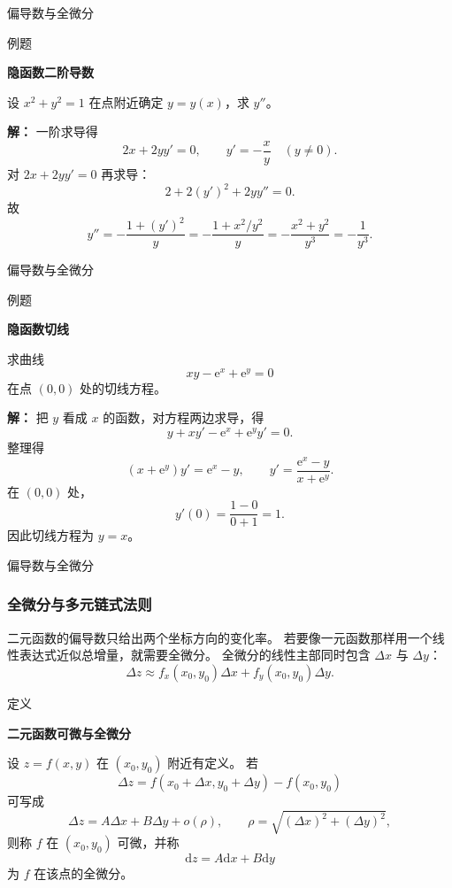\documentclass[aspectratio=169,10pt,fontset=fandol]{ctexbeamer}
\newcommand{\dd}{\mathrm{d}}
\newcommand{\ee}{\mathrm{e}}
\begin{document}
\begin{frame}[t,fragile]{偏导数与全微分}
\normalsize
\begin{block}{例题}
{\normalsize
\textbf{隐函数二阶导数}\par

	设 $x^2+y^2=1$ 在点附近确定 $y=y(x)$，求 $y''$。

}
\end{block}
\pause
{\normalsize
\textbf{解：}
一阶求导得
	\[
	2x+2yy'=0,\qquad y'=-\frac{x}{y}\quad(y\neq0).
	\]
	对 $2x+2yy'=0$ 再求导：
	\[
	2+2(y')^2+2yy''=0.
	\]
	故
	\[
	y''=-\frac{1+(y')^2}{y}=-\frac{1+x^2/y^2}{y}
	=-\frac{x^2+y^2}{y^3}=-\frac1{y^3}.
	\]

}
\end{frame}
\begin{frame}[t,fragile]{偏导数与全微分}
\footnotesize
\begin{block}{例题}
{\footnotesize
\textbf{隐函数切线}\par

	求曲线
	\[
	xy-\ee^x+\ee^y=0
	\]
	在点 $(0,0)$ 处的切线方程。

}
\end{block}
\pause
{\footnotesize
\textbf{解：}
把 $y$ 看成 $x$ 的函数，对方程两边求导，得
	\[
	y+xy'-\ee^x+\ee^y y'=0.
	\]
	整理得
	\[
	(x+\ee^y)y'=\ee^x-y,\qquad
	y'=\frac{\ee^x-y}{x+\ee^y}.
	\]
	在 $(0,0)$ 处，
	\[
	y'(0)=\frac{1-0}{0+1}=1.
	\]
	因此切线方程为 $y=x$。

}
\end{frame}
\begin{frame}[t,fragile]{偏导数与全微分}
\small
{\small
\subsubsection*{全微分与多元链式法则}


}
{\small
二元函数的偏导数只给出两个坐标方向的变化率。 若要像一元函数那样用一个线性表达式近似总增量，就需要全微分。 全微分的线性主部同时包含 $\Delta x$ 与 $\Delta y$：
\[
\Delta z\approx f_x(x_0,y_0)\Delta x+f_y(x_0,y_0)\Delta y.
\]


}
\begin{block}{定义}
{\small
\textbf{二元函数可微与全微分}\par

设 $z=f(x,y)$ 在 $(x_0,y_0)$ 附近有定义。 若
\[
\Delta z=f(x_0+\Delta x,y_0+\Delta y)-f(x_0,y_0)
\]
可写成
\[
\Delta z=A\Delta x+B\Delta y+o(\rho),
\qquad \rho=\sqrt{(\Delta x)^2+(\Delta y)^2},
\]
则称 $f$ 在 $(x_0,y_0)$ 可微，并称
\[
\dd z=A\dd x+B\dd y
\]
为 $f$ 在该点的全微分。

}
\end{block}
\end{frame}
\end{document}
